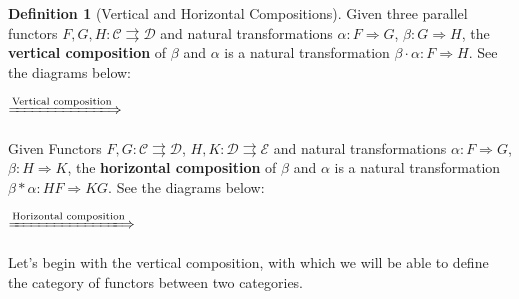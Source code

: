 \documentclass{article}
\theoremstyle{definition}
\newtheorem{definition}{Definition}[section]
\theoremstyle{definition}
\theoremstyle{remark}
\begin{document}
	\begin{definition}[Vertical and Horizontal Compositions]
	Given three parallel functors $F,G,H:\mathcal{C}\rightrightarrows\mathcal{D}$ and natural transformations $\alpha:F\Rightarrow G$, $\beta:G\Rightarrow H$, the \textbf{vertical composition} of $\beta$ and $\alpha $ is a natural transformation $\beta\cdot \alpha:F\Rightarrow H$. See the diagrams below:
	\begin{center}
		$\xLongrightarrow{\text{Vertical composition}}$
	\end{center}
	Given Functors $F,G:\mathcal{C}\rightrightarrows\mathcal{D}$, $H,K:\mathcal{D}\rightrightarrows\mathcal{E}$ and natural transformations $\alpha:F\Rightarrow G$, $\beta:H\Rightarrow K$, the \textbf{horizontal composition} of $\beta$ and $\alpha$ is a natural transformation $\beta\ast\alpha:HF\Rightarrow KG$. See the diagrams below:
	\begin{center}
		$\xLongrightarrow{\text{Horizontal composition}}$
	\end{center}
	\end{definition}
	Let's begin with the vertical composition, with which we will be able to define the category of functors between two categories.
\end{document}
